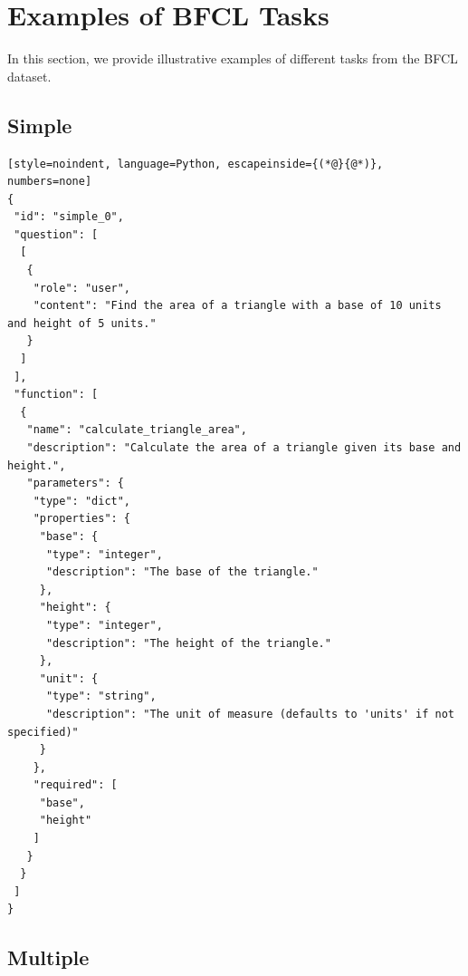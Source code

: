 \section{Examples of BFCL Tasks}
\label{app:bfcl_examples}

In this section, we provide illustrative examples of different tasks from the BFCL dataset.


\subsection{Simple} \mbox{}

\begin{lstlisting}[style=noindent, language=Python, escapeinside={(*@}{@*)}, numbers=none]
{
 "id": "simple_0",
 "question": [
  [
   {
    "role": "user",
    "content": "Find the area of a triangle with a base of 10 units and height of 5 units."
   }
  ]
 ],
 "function": [
  {
   "name": "calculate_triangle_area",
   "description": "Calculate the area of a triangle given its base and height.",
   "parameters": {
    "type": "dict",
    "properties": {
     "base": {
      "type": "integer",
      "description": "The base of the triangle."
     },
     "height": {
      "type": "integer",
      "description": "The height of the triangle."
     },
     "unit": {
      "type": "string",
      "description": "The unit of measure (defaults to 'units' if not specified)"
     }
    },
    "required": [
     "base",
     "height"
    ]
   }
  }
 ]
}
\end{lstlisting}


\subsection{Multiple} \mbox{}

